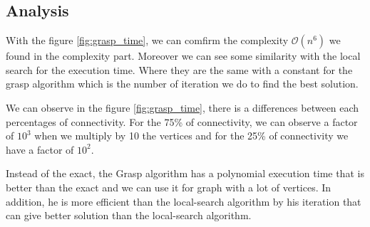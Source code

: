 
\subsection{Analysis}

With the figure \ref{fig:grasp_time}, we can comfirm the complexity $\mathcal{O}(n^6)$ we found in the complexity part.
Moreover we can see some similarity with the local search for the execution time. Where they are the same with a constant for the grasp algorithm 
which is the number of iteration we do to find the best solution.
\bigskip

We can observe in the figure \ref{fig:grasp_time}, there is a differences between each percentages of connectivity.
For the 75\% of connectivity, we can observe a factor of $10^3$ when we multiply by 10 the vertices and for the 25\% of connectivity
we have a factor of $10^2$.
\bigskip

Instead of the exact, the Grasp algorithm has a polynomial execution time that is better than the exact and we can use it for graph with a lot of vertices.
In addition, he is more efficient than the local-search algorithm by his iteration that can give better solution than the local-search algorithm.